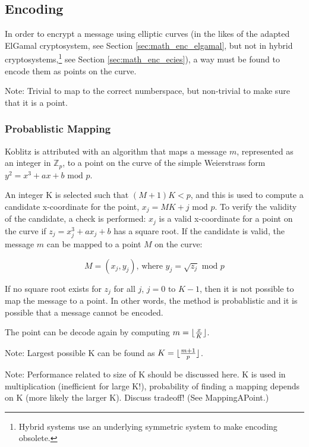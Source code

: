 \subsection{Encoding}
\label{sec:math_encoding}

In order to encrypt a message using elliptic curves (in the likes of the adapted ElGamal cryptosystem, see Section \ref{sec:math_enc_elgamal},
but not in hybrid cryptosystems,\footnote{Hybrid systems use an underlying symmetric system to make encoding obsolete.} see Section
\ref{sec:math_enc_ecies}), a way must be found to encode them as points on the curve.

Note: Trivial to map to the correct numberspace, but non-trivial to make sure that it is a point.

\subsubsection{Probablistic Mapping}

Koblitz is attributed with an algorithm that maps a message \(m\), represented as an integer in \(\mathbb{Z}_p\), to a point on the curve of the
simple Weierstrass form \(y^2 = x^3 + ax + b \text{ mod } p\).

An integer K is selected such that \((M + 1)K < p\), and this is used to compute
a candidate x-coordinate for the point, \(x_j = MK + j \text{ mod } p\). To verify the validity of the candidate, a check is performed: \(x_j\)
is a valid x-coordinate for a point on the curve if \(z_j = x_j^3 + ax_j + b\) has a square root. If the candidate is valid, the message \(m\)
can be mapped to a point \(M\) on the curve:

\begin{equation}
	M = (x_j, y_j) \text{, where } y_j = \sqrt{z_j} \text{ mod } p
\end{equation}

If no square root exists for \(z_j\) for all \(j\), \(j = 0 \text{ to } K-1\), then it is not possible to map the message to a point. In other
words, the method is probablistic and it is possible that a message cannot be encoded.\cite{MappingAMessage}

The point can be decode again by computing \(m = {\lfloor {{x} \over {K}} \rfloor}\).

Note: Largest possible K can be found as \(K = \lfloor {{m + 1} \over {p}} \rfloor\).

Note: Performance related to size of K should be discussed here. K is used in multiplication (inefficient for large K!), probability of finding
a mapping depends on K (more likely the larger K). Discuss tradeoff! (See MappingAPoint.)

